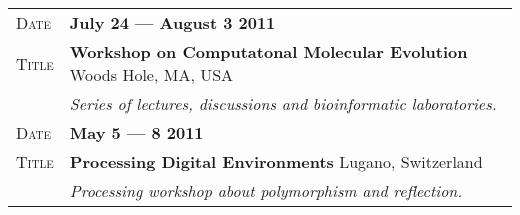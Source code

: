 \documentclass[a4paper, oneside, final]{scrartcl}
\newenvironment{lyxlist}[1]
{\begin{list}{}
{\settowidth{\labelwidth}{#1}
 \setlength{\leftmargin}{\labelwidth}
 \addtolength{\leftmargin}{\labelsep}
 \renewcommand{\makelabel}[1]{##1\hfil}}}
{\end{list}}
\newcommand{\noun}[1]{\textsc{#1}}
\newcommand{\gray}{\rowcolor[gray]{.90}}
\begin{document}
\begin{center}
\begin{tabularx}{0.97\linewidth}{>{\raggedleft\scshape}p{2cm}X}
       \gray Date & \textbf{July 24 --- August 3 2011}\\
    \gray Title  & \textbf{Workshop on Computatonal Molecular Evolution} \hfill Woods Hole, MA, USA\\
           & \emph{Series of lectures, discussions and bioinformatic laboratories.}
   \\

       \gray Date & \textbf{May 5 --- 8 2011 }\\
    \gray Title  & \textbf{Processing Digital Environments} \hfill Lugano, Switzerland\\
           & \emph{Processing workshop about polymorphism and reflection.}
    \end{tabularx}

%
%
%



\end{center}
\end{document}
